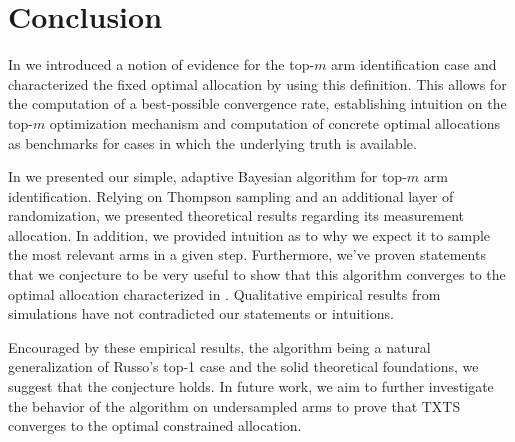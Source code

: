 \chapter{Conclusion}\label{chapter:conclusion}

In  we introduced a notion of evidence for the top-$m$ arm
identification case and characterized the fixed optimal allocation by using this
definition. This allows for the computation of a best-possible convergence rate,
establishing intuition on the top-$m$ optimization mechanism and computation of
concrete optimal allocations as benchmarks for cases in which the underlying
truth is available.

In  we presented our simple, adaptive Bayesian algorithm
for top-$m$ arm identification. Relying on Thompson sampling and an additional
layer of randomization, we presented theoretical results regarding its
measurement allocation. In addition, we provided intuition as to why we expect
it to sample the most relevant arms in a given step. Furthermore, we've proven
statements that we conjecture to be very useful to show that this algorithm
converges to the optimal allocation characterized in .
Qualitative empirical results from simulations have not contradicted our
statements or intuitions.

Encouraged by these empirical results, the algorithm being a natural
generalization of Russo's top-1 case and the solid theoretical foundations, we
suggest that the conjecture holds. In future work, we aim to further investigate
the behavior of the algorithm on undersampled arms to prove that TXTS converges
to the optimal constrained allocation.
